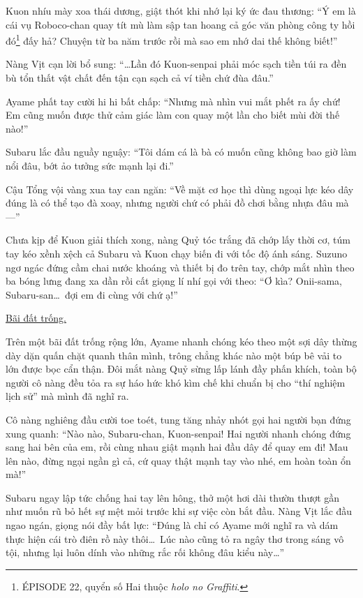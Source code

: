 \documentclass[../main.tex]{subfiles}
\begin{document}
Kuon nhíu mày xoa thái dương, giật thót khi nhớ lại ký ức đau thương: ``Ý em là cái vụ Roboco-chan quay tít mù làm sập tan hoang cả góc văn phòng công ty hồi đó\footnote{{\flaregothic ÉPISODE 22}, quyển số Hai thuộc \textit{holo no Graffiti}.} đấy hả? Chuyện từ ba năm trước rồi mà sao em nhớ dai thế không biết!''

Nàng Vịt cạn lời bổ sung: ``\dots Lần đó Kuon-senpai phải móc sạch tiền túi ra đền bù tổn thất vật chất đến tận cạn sạch cả ví tiền chứ đùa đâu.''

Ayame phất tay cười hi hi bất chấp: ``Nhưng mà nhìn vui mắt phết ra ấy chứ! Em cũng muốn được thử cảm giác làm con quay một lần cho biết mùi đời thế nào!''

Subaru lắc đầu nguầy nguậy: ``Tôi dám cá là bà có muốn cũng không bao giờ làm nổi đâu, bớt ảo tưởng sức mạnh lại đi.''

Cậu Tổng vội vàng xua tay can ngăn: ``Về mặt cơ học thì dùng ngoại lực kéo dây đúng là có thể tạo đà xoay, nhưng người chứ có phải đồ chơi bằng nhựa đâu mà—''

Chưa kịp để Kuon giải thích xong, nàng Quỷ tóc trắng đã chớp lấy thời cơ, túm tay kéo xềnh xệch cả Subaru và Kuon chạy biến đi với tốc độ ánh sáng. Suzuno ngơ ngác đứng cầm chai nước khoáng và thiết bị đo trên tay, chớp mắt nhìn theo ba bóng lưng đang xa dần rồi cất giọng lí nhí gọi với theo: ``Ơ kìa? Onii-sama, Subaru-san\dots\ đợi em đi cùng với chứ ạ!''

\begin{center}
    \uline{Bãi đất trống.}
\end{center}

Trên một bãi đất trống rộng lớn, Ayame nhanh chóng kéo theo một sợi dây thừng dày dặn quấn chặt quanh thân mình, trông chẳng khác nào một búp bê vải to lớn được bọc cẩn thận. Đôi mắt nàng Quỷ sừng lấp lánh đầy phấn khích, toàn bộ người cô nàng đều tỏa ra sự háo hức khó kìm chế khi chuẩn bị cho ``thí nghiệm lịch sử'' mà mình đã nghĩ ra.

Cô nàng nghiêng đầu cười toe toét, tung tăng nhảy nhót gọi hai người bạn đứng xung quanh: ``Nào nào, Subaru-chan, Kuon-senpai! Hai người nhanh chóng đứng sang hai bên của em, rồi cùng nhau giật mạnh hai đầu dây để quay em đi! Mau lên nào, đừng ngại ngần gì cả, cứ quay thật mạnh tay vào nhé, em hoàn toàn ổn mà!''

Subaru ngay lập tức chống hai tay lên hông, thở một hơi dài thườn thượt gần như muốn rũ bỏ hết sự mệt mỏi trước khi sự việc còn bắt đầu. Nàng Vịt lắc đầu ngao ngán, giọng nói đầy bất lực: ``Đúng là chỉ có Ayame mới nghĩ ra và dám thực hiện cái trò điên rồ này thôi\dots\ Lúc nào cũng tỏ ra ngây thơ trong sáng vô tội, nhưng lại luôn dính vào những rắc rối không đâu kiểu này\dots''
\end{document}
